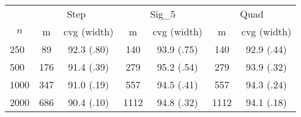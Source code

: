 \documentclass{article}
\begin{document}
\begin{tabular}{lcccccc}
   \toprule
 
           & \multicolumn{2}{c}{Step}& \multicolumn{2}{c}{Sig\_5}& \multicolumn{2}{c}{Quad} \\ 
             \cmidrule(l{2pt}r{2pt}){2-3} \cmidrule(l{2pt}r{2pt}){4-5} \cmidrule(l{2pt}r{2pt}){6-7} 
             \multicolumn{1}{c}{$n$} & \multicolumn{1}{c}{m}& \multicolumn{1}{c}{cvg (width)}& \multicolumn{1}{c}{m}& \multicolumn{1}{c}{cvg (width)}& \multicolumn{1}{c}{m}& \multicolumn{1}{c}{cvg (width)} \\ \midrule 
        250 & 89 & 92.3 (.80) & 140 & 93.9 (.75) & 140 & 92.9 (.44) \\ 
  500 & 176 & 91.4 (.39) & 279 & 95.2 (.54) & 279 & 93.9 (.32) \\ 
  1000 & 347 & 91.0 (.19) & 557 & 94.5 (.41) & 557 & 94.3 (.24) \\ 
  2000 & 686 & 90.4 (.10) & 1112 & 94.8 (.32) & 1112 & 94.1 (.18) \\ 
   \hline
\end{tabular}
\end{document}
